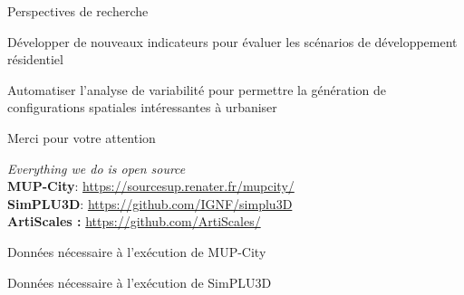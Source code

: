 \documentclass[xcolor=table]{beamer}
\begin{document}
\begin{frame}{Perspectives de recherche}
	\begin{block}{}
	Développer de nouveaux indicateurs pour évaluer les scénarios de développement résidentiel
	\end{block}
	\begin{block}{}
	Automatiser l'analyse de variabilité pour permettre la génération de configurations spatiales intéressantes à urbaniser
	\end{block}
\end{frame}



\begin{frame}[standout]
	\centering
	\begin{block}{}	
		\centering	
		Merci pour votre attention
	\end{block}
	\begin{block}{}
		\centering
		\textit{Everything we do is open source}\\
		\large
		\textbf{MUP-City}: \url{https://sourcesup.renater.fr/mupcity/} \\
		\textbf{SimPLU3D}: \url{https://github.com/IGNF/simplu3D}\\
		\textbf{ArtiScales :} \url{https://github.com/ArtiScales/}
	\end{block}
\end{frame}

\begin{frame}{Données nécessaire à l'exécution de MUP-City}
\end{frame}
\begin{frame}{Données nécessaire à l'exécution de SimPLU3D}
\end{frame}
\end{document}
